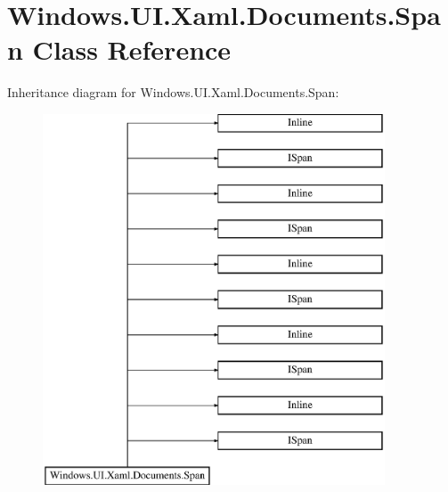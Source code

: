 \hypertarget{class_windows_1_1_u_i_1_1_xaml_1_1_documents_1_1_span}{}\section{Windows.\+U\+I.\+Xaml.\+Documents.\+Span Class Reference}
\label{class_windows_1_1_u_i_1_1_xaml_1_1_documents_1_1_span}
Inheritance diagram for Windows.\+U\+I.\+Xaml.\+Documents.\+Span\+:\begin{figure}[H]
\begin{center}
\leavevmode
\includegraphics[height=11.000000cm]{class_windows_1_1_u_i_1_1_xaml_1_1_documents_1_1_span}
\end{center}
\end{figure}
